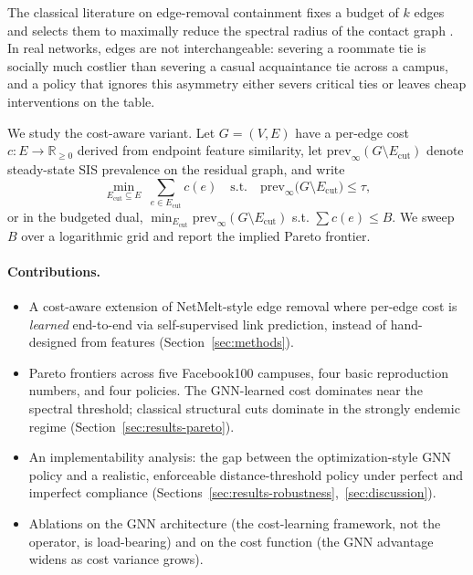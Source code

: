 \documentclass{article}
\begin{document}
The classical literature on edge-removal containment fixes a budget of
$k$ edges and selects them to maximally reduce the spectral radius of
the contact graph \citep{wang2003threshold,tong2012netmelt,
saha2015greedywalk,yi2022supermodular}. In real networks, edges are
not interchangeable: severing a roommate tie is socially much costlier
than severing a casual acquaintance tie across a campus, and a policy
that ignores this asymmetry either severs critical ties or leaves
cheap interventions on the table.

We study the cost-aware variant. Let $G = (V, E)$ have a per-edge cost
$c : E \to \mathbb{R}_{\geq 0}$ derived from endpoint feature
similarity, let $\mathrm{prev}_{\infty}(G \setminus E_{\mathrm{cut}})$
denote steady-state SIS prevalence on the residual graph, and write
\begin{equation}
\label{eq:problem}
\min_{E_{\mathrm{cut}} \subseteq E} \; \sum_{e \in E_{\mathrm{cut}}} c(e)
\quad \text{s.t.} \quad
\mathrm{prev}_{\infty}\!\bigl(G \setminus E_{\mathrm{cut}}\bigr) \le \tau,
\end{equation}
or in the budgeted dual,
$\min_{E_{\mathrm{cut}}} \mathrm{prev}_{\infty}(G \setminus
E_{\mathrm{cut}})$ s.t. $\sum c(e) \le B$. We sweep $B$ over a
logarithmic grid and report the implied Pareto frontier.

\paragraph{Contributions.}
\begin{itemize}
    \item A cost-aware extension of NetMelt-style edge removal where
    per-edge cost is \emph{learned} end-to-end via self-supervised
    link prediction, instead of hand-designed from features
    (Section~\ref{sec:methods}).
    \item Pareto frontiers across five Facebook100 campuses, four
    basic reproduction numbers, and four policies. The GNN-learned
    cost dominates near the spectral threshold; classical structural
    cuts dominate in the strongly endemic regime
    (Section~\ref{sec:results-pareto}).
    \item An implementability analysis: the gap between the
    optimization-style GNN policy and a realistic, enforceable
    distance-threshold policy under perfect and imperfect compliance
    (Sections~\ref{sec:results-robustness},~\ref{sec:discussion}).
    \item Ablations on the GNN architecture (the cost-learning
    framework, not the operator, is load-bearing) and on the cost
    function (the GNN advantage widens as cost variance grows).
\end{itemize}
\end{document}
